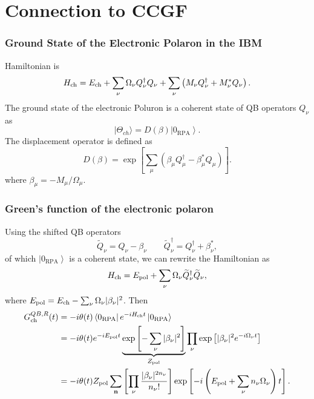 \section{Connection to CCGF}
\begin{frame}
    \frametitle{Ground State of the Electronic Polaron in the IBM}
Hamiltonian is 
\begin{equation}
H_{\rm ch}
=
E_{\rm ch}
+
\sum_\nu
\Omega_\nu Q_\nu^\dagger Q_\nu
+
\sum_\nu
\left(
M_\nu Q_\nu^\dagger
+
M_\nu^* Q_\nu
\right).
\end{equation}
\pause
The ground state of the electronic Poluron is a coherent state of QB operators $Q_\nu$ as
\begin{equation}
    |\Theta_{ch}\rangle = D(\beta)\left|0_{\mathrm{RPA}}\right\rangle.
\end{equation} 
\pause
The displacement operator is defined as
\begin{equation}
    D(\beta)=\exp \left[\sum_\mu\left(\beta_\mu Q_\mu^{\dagger}-\beta_\mu^* Q_\mu\right)\right] .
\end{equation}
where $\beta_\mu = -M_\mu / \Omega_\mu$.
\end{frame}
\begin{frame}
    \frametitle{Green's function of the electronic polaron}
Using the shifted QB operators
\begin{equation}
\widetilde Q_\nu
=
Q_\nu
- \beta_\nu
\qquad
\widetilde Q_\nu^\dagger
=
Q_\nu^\dagger
+
\beta_\nu^*,
\end{equation}
of which $\left|0_{\mathrm{RPA}}\right\rangle$ is a coherent state,
\pause we can rewrite the Hamiltonian as
\begin{equation}
H_{\rm ch}
=
E_{\rm pol}
+
\sum_\nu
\Omega_\nu
\widetilde Q_\nu^\dagger \widetilde Q_\nu ,
\end{equation}
where $E_{\rm pol}=E_{\rm ch}-\sum_\nu \Omega_\nu |\beta_\nu|^2$. \pause Then
\begin{align}
G^{QB,R}_{\rm ch}(t)
&=
-i \theta(t)
\left\langle 0_{\rm RPA} \right|
e^{-i H_{\rm ch} t}
\left|0_{\rm RPA}\right\rangle
\\
&=
-i \theta(t)
e^{-i E_{\rm pol} t}
\underbrace{
\exp
\left[
-\sum_{\nu} |\beta_{\nu}|^2
\right]
}_{Z_{\rm pol}}
\prod_{\nu}
\exp
\left[
|\beta_{\nu}|^2 e^{-i\Omega_{\nu} t}
\right]
\\
&=
-i \theta(t)
Z_{\rm pol}
\sum_{\mathbf n}
\left[
\prod_{\nu}
\frac{
|\beta_{\nu}|^{2n_{\nu}}
}{
n_{\nu}!
}
\right]
\exp
\left[
-i
\left(
E_{\rm pol}
+
\sum_{\nu} n_{\nu}\Omega_{\nu}
\right)t
\right].
\end{align}
\end{frame}
